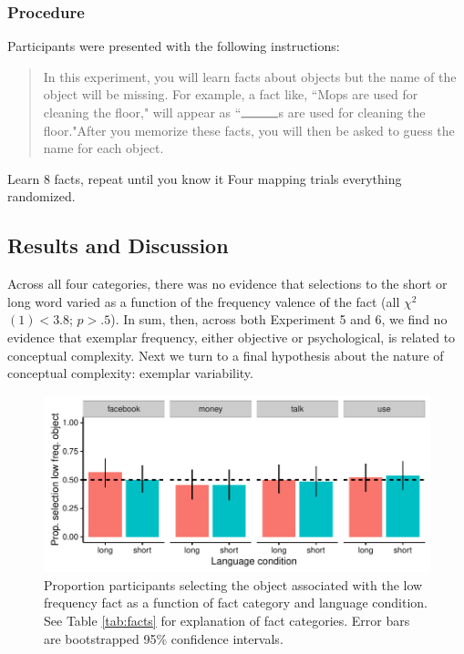 \subsubsection{Procedure}
Participants were presented with the following instructions:

\begin{quote}
In this experiment, you will learn facts about objects but the name of the object will be missing. For example, a fact like, ``Mops are used for cleaning the floor," will appear as ``$\rule{1cm}{0.15mm}$s are used for cleaning the floor."After you memorize these facts, you will then be asked to guess the name for each object. 
\end{quote}

Learn 8 facts, repeat until you know it
Four mapping trials
everything randomized.
\subsection{Results and Discussion}
Across all four categories, there was no evidence that selections to the short or long word varied as a function of the frequency valence of the fact (all ${\chi}^2$$(1) < 3.8$; $p > .5$). In sum, then, across both Experiment 5 and 6, we find no evidence that exemplar frequency, either objective  or psychological, is related to conceptual complexity. Next we turn to a final hypothesis about the nature of conceptual complexity: exemplar variability.

  \begin{figure}
 \begin{center}
  \includegraphics[width=6in]{figs/fact_plots.pdf}
  \caption{\label{fig:fact_plots} Proportion participants selecting the object associated with the low frequency fact as a function of fact category and language condition. See Table \ref{tab:facts} for explanation of fact categories. Error bars are bootstrapped 95\% confidence intervals.}
 \end{center}
\end{figure}



